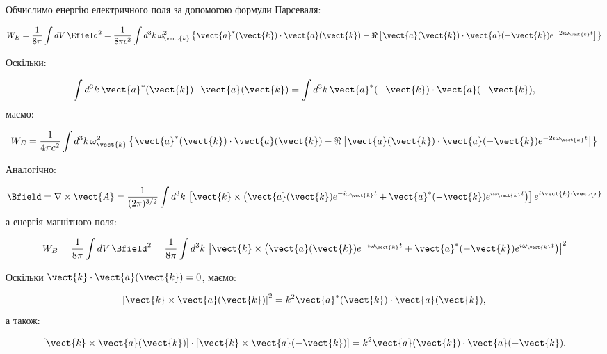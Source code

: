 Обчислимо енергію електричного поля за допомогою формули Парсеваля:

\begin{equation}
W_E = \frac{1}{8\pi} \int dV \, \Efield^2 = \frac{1}{8\pi c^2} \int d^3k \, \omega_{\vect{k}}^2 \left\{ \vect{a}^*(\vect{k}) \cdot \vect{a}(\vect{k}) -
\Re \left[ \vect{a}(\vect{k}) \cdot \vect{a}(-\vect{k}) e^{-2i\omega_{\vect{k}} t} \right] \right\}
\label{eq:W_E}
\end{equation}

Оскільки:

\begin{equation*}
\int d^3k \, \vect{a}^*(\vect{k}) \cdot \vect{a}(\vect{k}) = \int d^3k \, \vect{a}^*(-\vect{k}) \cdot \vect{a}(-\vect{k}),
\end{equation*}
маємо:

\begin{equation}
W_E = \frac{1}{4\pi c^2} \int d^3k \, \omega_{\vect{k}}^2 \left\{ \vect{a}^*(\vect{k}) \cdot \vect{a}(\vect{k}) - \Re \left[ \vect{a}(\vect{k})
\cdot \vect{a}(-\vect{k}) e^{-2i\omega_{\vect{k}} t} \right] \right\}
\label{eq:W_E_final}
\end{equation}

Аналогічно:

\begin{equation}
\Bfield = \nabla \times \vect{A} = \frac{1}{(2\pi)^{3/2}} \int d^3k \, \left[ \vect{k} \times \left( \vect{a}(\vect{k}) e^{-i\omega_{\vect{k}} t} +
\vect{a}^*(-\vect{k}) e^{i\omega_{\vect{k}} t} \right) \right] e^{i\vect{k} \cdot \vect{r}}
\label{eq:B_field_fourier}
\end{equation}
а енергія магнітного поля:

\begin{equation}
W_B = \frac{1}{8\pi} \int dV \, \Bfield^2 = \frac{1}{8\pi} \int d^3k \, \left| \vect{k} \times \left( \vect{a}(\vect{k}) e^{-i\omega_{\vect{k}} t} +
\vect{a}^*(-\vect{k}) e^{i\omega_{\vect{k}} t} \right) \right|^2
\label{eq:W_B}
\end{equation}

Оскільки \(\vect{k} \cdot \vect{a}(\vect{k}) = 0\), маємо:

\begin{equation*}
\left| \vect{k} \times \vect{a}(\vect{k}) \right|^2 = k^2 \vect{a}^*(\vect{k}) \cdot \vect{a}(\vect{k}),
\end{equation*}
а також:

\begin{equation*}
\left[ \vect{k} \times \vect{a}(\vect{k}) \right] \cdot \left[ \vect{k} \times \vect{a}(-\vect{k}) \right] = k^2 \vect{a}(\vect{k}) \cdot
\vect{a}(-\vect{k}).
\end{equation*}

